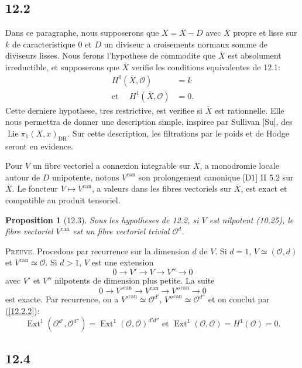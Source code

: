 \documentclass[12pt,a4paper]{article}
\theoremstyle{plain}
\newtheorem{proposition}[theorem]{Proposition}
\theoremstyle{definition}
\theoremstyle{remark}
\DeclareMathOperator{\Lie}{Lie}
\DeclareMathOperator{\Ext}{Ext}
\newcommand{\DR}{\mathrm{DR}}
\newcommand{\can}{\mathrm{can}}
\begin{document}
\subsection*{12.2}

Dans ce paragraphe, nous supposerons que $X = \bar{X} - D$ avec $\bar{X}$ propre et lisse sur $k$ de caracteristique 0 et $D$ un diviseur a croisements normaux somme de diviseurs lisses. Nous ferons l'hypothese de commodite que $\bar{X}$ est absolument irreductible, et supposerons que $\bar{X}$ verifie les conditions equivalentes de 12.1:
\begin{align}
H^0(\bar{X}, \mathcal{O}) &= k \label{12.2.1} \\
\text{et } \quad H^1(\bar{X}, \mathcal{O}) &= 0. \label{12.2.2}
\end{align}
Cette derniere hypothese, tres restrictive, est verifiee si $\bar{X}$ est rationnelle. Elle nous permettra de donner une description simple, inspiree par Sullivan [Su], des $\Lie \pi_1(X, x)_{\DR}$. Sur cette description, les filtrations par le poids et de Hodge seront en evidence.

Pour $V$ un fibre vectoriel a connexion integrable sur $X$, a monodromie locale autour de $D$ unipotente, notons $V^{\can}$ son prolongement canonique [D1] II 5.2 sur $\bar{X}$. Le foncteur $V \mapsto V^{\can}$, a valeurs dans les fibres vectoriels sur $\bar{X}$, est exact et compatible au produit tensoriel.

\begin{proposition}[12.3]
Sous les hypotheses de 12.2, si $V$ est nilpotent (10.25), le fibre vectoriel $V^{\can}$ est un fibre vectoriel trivial $\mathcal{O}^d$.
\end{proposition}

\textsc{Preuve.} Procedons par recurrence sur la dimension $d$ de $V$. Si $d = 1$, $V \simeq (\mathcal{O}, d)$ et $V^{\can} \simeq \mathcal{O}$. Si $d > 1$, $V$ est une extension
$$0 \longrightarrow V' \longrightarrow V \longrightarrow V'' \longrightarrow 0$$
avec $V'$ et $V''$ nilpotents de dimension plus petite. La suite
$$0 \longrightarrow V'^{\can} \longrightarrow V^{\can} \longrightarrow V''^{\can} \longrightarrow 0$$
est exacte. Par recurrence, on a $V'^{\can} \simeq \mathcal{O}^{d'}$, $V''^{\can} \simeq \mathcal{O}^{d''}$ et on conclut par (\ref{12.2.2}):
$$\Ext^1(\mathcal{O}^{d'}, \mathcal{O}^{d''}) = \Ext^1(\mathcal{O}, \mathcal{O})^{d'd''} \text{ et } \Ext^1(\mathcal{O}, \mathcal{O}) = H^1(\mathcal{O}) = 0.$$

\subsection*{12.4}
\end{document}
